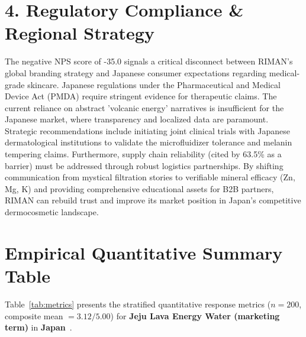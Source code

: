 \documentclass[10pt,twocolumn,a4paper]{article}
\begin{document}
\section{4. Regulatory Compliance \& Regional Strategy}
The negative NPS score of -35.0 signals a critical disconnect between RIMAN's global branding strategy and Japanese consumer expectations regarding medical-grade skincare. Japanese regulations under the Pharmaceutical and Medical Device Act (PMDA) require stringent evidence for therapeutic claims. The current reliance on abstract 'volcanic energy' narratives is insufficient for the Japanese market, where transparency and localized data are paramount. Strategic recommendations include initiating joint clinical trials with Japanese dermatological institutions to validate the microfluidizer tolerance and melanin tempering claims. Furthermore, supply chain reliability (cited by 63.5\% as a barrier) must be addressed through robust logistics partnerships. By shifting communication from mystical filtration stories to verifiable mineral efficacy (Zn, Mg, K) and providing comprehensive educational assets for B2B partners, RIMAN can rebuild trust and improve its market position in Japan's competitive dermocosmetic landscape.


\section{Empirical Quantitative Summary Table}
Table~\ref{tab:metrics} presents the stratified quantitative response metrics ($n = 200$, composite mean $= 3.12/5.00$) for \textbf{Jeju Lava Energy Water (marketing term)} in \textbf{Japan}~\cite{ref_kaggle_doi,ref_hf_doi}.
\end{document}
